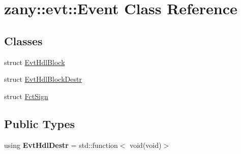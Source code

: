\hypertarget{classzany_1_1evt_1_1_event}{}\section{zany\+:\+:evt\+:\+:Event Class Reference}
\label{classzany_1_1evt_1_1_event}
\subsection*{Classes}
\begin{DoxyCompactItemize}
\item 
struct \hyperlink{structzany_1_1evt_1_1_event_1_1_evt_hdl_block}{Evt\+Hdl\+Block}
\item 
struct \hyperlink{structzany_1_1evt_1_1_event_1_1_evt_hdl_block_destr}{Evt\+Hdl\+Block\+Destr}
\item 
struct \hyperlink{structzany_1_1evt_1_1_event_1_1_fct_sign}{Fct\+Sign}
\end{DoxyCompactItemize}
\subsection*{Public Types}
\begin{DoxyCompactItemize}
\item 
\mbox{\label{classzany_1_1evt_1_1_event_ac9f7ccc11f6d8972fef33a0a0dd0625a}} 
using {\bfseries Evt\+Hdl\+Destr} = std\+::function$<$ void(void)$>$
\end{DoxyCompactItemize}
